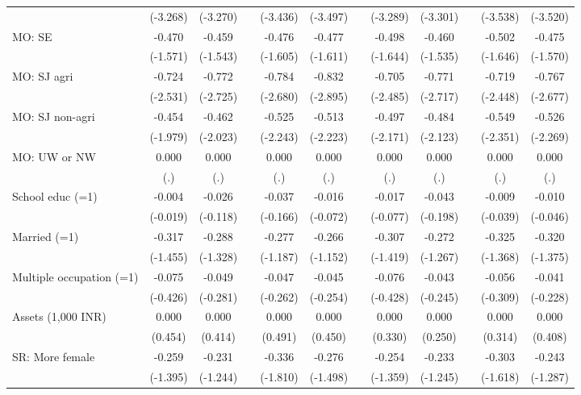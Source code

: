 {\begin{longtable}{@{\extracolsep{\fill}}lccccccccccc}
      & (-3.268) & (-3.270) &   & (-3.436) & (-3.497) &   & (-3.289) & (-3.301) &   & (-3.538) & (-3.520) \\
    MO: SE & -0.470 & -0.459 &   & -0.476 & -0.477 &   & -0.498 & -0.460 &   & -0.502 & -0.475 \\
      & (-1.571) & (-1.543) &   & (-1.605) & (-1.611) &   & (-1.644) & (-1.535) &   & (-1.646) & (-1.570) \\
    MO: SJ agri & -0.724 & -0.772 &   & -0.784 & -0.832 &   & -0.705 & -0.771 &   & -0.719 & -0.767 \\
      & (-2.531) & (-2.725) &   & (-2.680) & (-2.895) &   & (-2.485) & (-2.717) &   & (-2.448) & (-2.677) \\
    MO: SJ non-agri & -0.454 & -0.462 &   & -0.525 & -0.513 &   & -0.497 & -0.484 &   & -0.549 & -0.526 \\
      & (-1.979) & (-2.023) &   & (-2.243) & (-2.223) &   & (-2.171) & (-2.123) &   & (-2.351) & (-2.269) \\
    MO: UW or NW & 0.000 & 0.000 &   & 0.000 & 0.000 &   & 0.000 & 0.000 &   & 0.000 & 0.000 \\
      & (.) & (.) &   & (.) & (.) &   & (.) & (.) &   & (.) & (.) \\
    School educ (=1) & -0.004 & -0.026 &   & -0.037 & -0.016 &   & -0.017 & -0.043 &   & -0.009 & -0.010 \\
      & (-0.019) & (-0.118) &   & (-0.166) & (-0.072) &   & (-0.077) & (-0.198) &   & (-0.039) & (-0.046) \\
    Married (=1) & -0.317 & -0.288 &   & -0.277 & -0.266 &   & -0.307 & -0.272 &   & -0.325 & -0.320 \\
      & (-1.455) & (-1.328) &   & (-1.187) & (-1.152) &   & (-1.419) & (-1.267) &   & (-1.368) & (-1.375) \\
    Multiple occupation (=1) & -0.075 & -0.049 &   & -0.047 & -0.045 &   & -0.076 & -0.043 &   & -0.056 & -0.041 \\
      & (-0.426) & (-0.281) &   & (-0.262) & (-0.254) &   & (-0.428) & (-0.245) &   & (-0.309) & (-0.228) \\
    Assets (1,000 INR) & 0.000 & 0.000 &   & 0.000 & 0.000 &   & 0.000 & 0.000 &   & 0.000 & 0.000 \\
      & (0.454) & (0.414) &   & (0.491) & (0.450) &   & (0.330) & (0.250) &   & (0.314) & (0.408) \\
    SR: More female & -0.259 & -0.231 &   & -0.336 & -0.276 &   & -0.254 & -0.233 &   & -0.303 & -0.243 \\
      & (-1.395) & (-1.244) &   & (-1.810) & (-1.498) &   & (-1.359) & (-1.245) &   & (-1.618) & (-1.287) \\

\end{longtable}}
